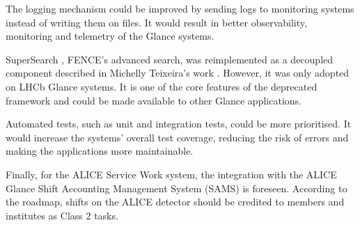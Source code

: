 The logging mechanism could be improved by sending logs to monitoring systems instead of writing them on files. It would result in better observability, monitoring and telemetry of the Glance systems.

SuperSearch \cite{lange-tcc}, FENCE's advanced search, was reimplemented as a decoupled component described in Michelly Teixeira's work \cite{de-jesus-tcc}. However, it was only adopted on LHCb Glance systems. It is one of the core features of the deprecated framework and could be made available to other Glance applications.

Automated tests, such as unit and integration tests, could be more prioritised. It would increase the systems' overall test coverage, reducing the risk of errors and making the applications more maintainable.

Finally, for the ALICE Service Work system, the integration with the ALICE Glance Shift Accounting Management System (SAMS) is foreseen. According to the roadmap, shifts on the ALICE detector should be credited to members and institutes as Class 2 tasks.
